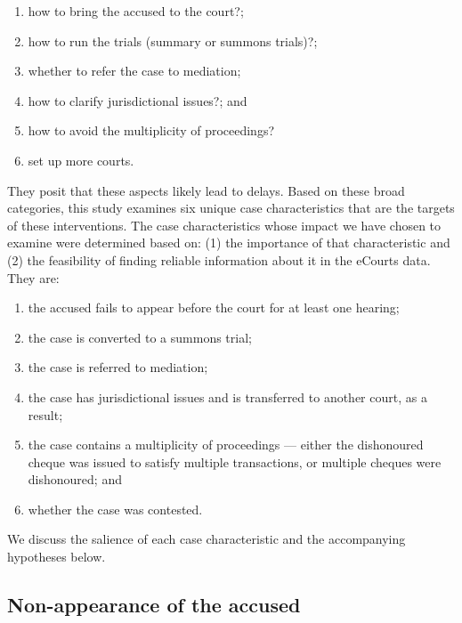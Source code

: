 \documentclass[12pt,a4paper]{article}
\begin{document}
\begin{enumerate}
\item how to bring the accused to the court?;
\item how to run the trials (summary or summons trials)?;
\item whether to refer the case to mediation;
\item how to clarify jurisdictional issues?; and
\item how to avoid the multiplicity of proceedings?
\item set up more courts.
\end{enumerate}

They posit that these aspects likely lead to delays. Based on these broad categories, this study examines six unique case characteristics that are the targets of these interventions. The case characteristics whose impact we have chosen to examine were determined based on: (1) the importance of that characteristic and (2) the feasibility of finding reliable information about it in the eCourts data. They are:

\begin{enumerate}
\item the accused fails to appear before the court for at least one hearing;
\item the case is converted to a summons trial;
\item the case is referred to mediation;
\item the case has jurisdictional issues and is transferred to another court, as a result;
\item the case contains a multiplicity of proceedings --- either the dishonoured cheque was issued to satisfy multiple transactions, or multiple cheques were dishonoured; and
\item whether the case was contested.
\end{enumerate}

We discuss the salience of each case characteristic and the accompanying hypotheses below.

\subsection{Non-appearance of the accused}
\label{sec:non-appe-accus}
\end{document}
